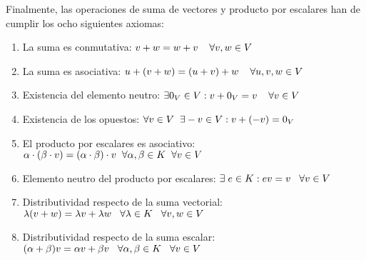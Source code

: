 \documentclass[12pt]{article}
\begin{document}
\vspace{2mm}
Finalmente, las operaciones de suma de vectores y producto por escalares han de cumplir los ocho siguientes axiomas:
\begin{enumerate}[label = E.\arabic*)]
    \item La suma es conmutativa: \hspace{2mm}
        $v + w = w + v \hspace{4mm} \forall v,w \in V$
    \item La suma es asociativa: \hspace{2mm}
        $u + (v + w) = (u + v) + w \hspace{4mm} \forall u,v,w \in V$
    \item Existencia del elemento neutro: \hspace{2mm}
        $\exists 0_V \in V : v + 0_V = v \hspace{4mm} \forall v \in V$
    \item Existencia de los opuestos: \hspace{2mm}
        $\forall v \in V \hspace{2mm} \exists -v \in V : 
            v + (-v) = 0_V$
    \item El producto por escalares es asociativo: \hspace{1mm}
        $\alpha \cdot (\beta \cdot v) = (\alpha \cdot  \beta) \cdot v
            \hspace{2mm} \forall \alpha, \beta \in K
            \hspace{2mm} \forall v \in V$
    \item Elemento neutro del producto por escalares: \hspace{2mm}
        $\exists \hspace{1mm} e \in K : e v = v \hspace{3mm} \forall v \in V$   
    \item Distributividad respecto de la suma vectorial:\\
        $\lambda(v + w) = \lambda v + \lambda w \hspace{3mm}
            \forall \lambda \in K \hspace{3mm} \forall v,w \in V$
    \item Distributividad respecto de la suma escalar: \\
        $(\alpha + \beta)v = \alpha v + \beta v \hspace{3mm}
            \forall \alpha, \beta \in K \hspace{3mm} \forall v \in V$
\end{enumerate}
\end{document}
